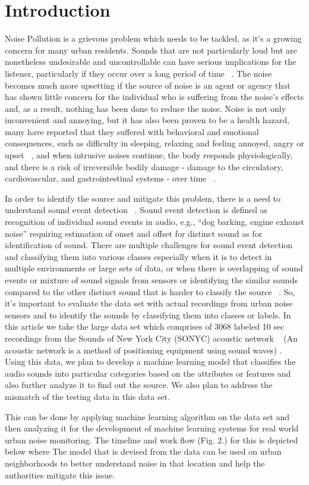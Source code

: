 \section{Introduction}
Noise Pollution is a grievous problem which needs to be tackled, as it’s a growing concern for many urban residents. Sounds that are not particularly loud but are nonetheless undesirable and uncontrollable can have serious implications for the listener, particularly if they occur over a long period of time ~\cite{3}. The noise becomes much more upsetting if the source of noise is an agent or agency that has shown little concern for the individual who is suffering from the noise's effects and, as a result, nothing has been done to reduce the noise. Noise is not only inconvenient and annoying, but it has also been proven to be a health hazard, many have reported that they suffered with behavioral and emotional consequences, such as difficulty in sleeping, relaxing and feeling annoyed, angry or upset ~\cite{2}, and when intrusive noises continue, the body responds physiologically, and there is a risk of irreversible bodily damage - damage to the circulatory, cardiovascular, and gastrointestinal systems - over time ~\cite{1}.


In order to identify the source and mitigate this problem, there is a need to understand sound event detection ~\cite{6}. Sound event detection is defined as recognition of individual sound events in audio, e.g., “dog barking, engine exhaust noise” requiring estimation of onset and offset for distinct sound as for identification of sound. There are multiple challenges for sound event detection and classifying them into various classes especially when it is to detect in multiple environments or large sets of data, or when there is overlapping of sound events or mixture of sound signals from sensors or identifying the similar sounds compared to the other distinct sound that is harder to classify the source ~\cite{8}. So, it's important to evaluate the data set with actual recordings from urban noise sensors and to identify the sounds by classifying them into classes or labels. In this article we take the large data set which comprises of 3068 labeled 10 sec recordings from the Sounds of New York City (SONYC) acoustic network ~\cite{7} (An acoustic network is a method of positioning equipment using sound waves) . Using this data, we plan to develop a machine learning model that classifies the audio sounds into particular categories based on the attributes or features and also further analyze it to find out the source. We also plan to address the mismatch of the testing data in this data set.

This can be done by applying machine learning algorithm on the data set and then analyzing it for the development of machine learning systems for real world urban noise monitoring. The timeline and work flow (Fig. 2.) for this is depicted below where The model that is devised from the data can be used on urban neighborhoods to better understand noise in that location and help the authorities mitigate this issue.   
